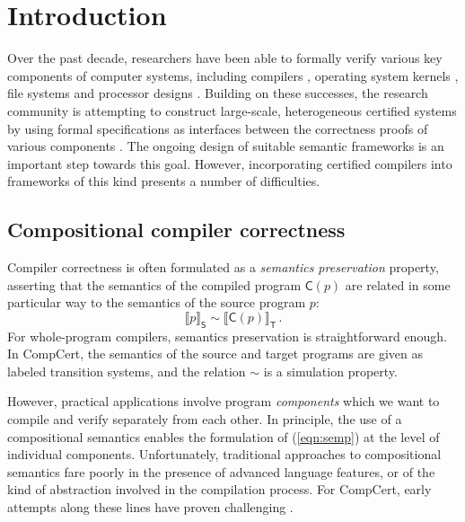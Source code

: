 \documentclass[sigplan,screen]{acmart}
\newcommand{\kw}[1]{\ensuremath{ \mathsf{#1} }}
\begin{document}


\maketitle

\section{Introduction} %


Over the past decade,
researchers have been able to formally verify
various key components of computer systems,
including
compilers \cite{compcert,cakeml,vellvm},
operating system kernels \cite{sel4,popl15},
file systems \cite{fscq} and
processor designs \cite{safe,kami}.
Building on these successes,
the research community is attempting
to construct large-scale, heterogeneous certified systems
by using formal specifications as interfaces between
the correctness proofs of various components
\cite{deepspec}.
The ongoing design of suitable semantic frameworks
is an important step towards this goal.
However,
incorporating certified compilers
into frameworks of this kind
presents a number of difficulties.


\subsection{Compositional compiler correctness} %

Compiler correctness is often formulated as a
\emph{semantics preservation} property,
asserting that the semantics
of the compiled program $\kw{C}(p)$
are related in some particular way
to the semantics
of the source program $p$:
\begin{equation} \label{eqn:semp}
  \llbracket p \rrbracket_\kw{S} \sim
  \llbracket \kw{C}(p) \rrbracket_\kw{T}
  \,.
\end{equation}
For whole-program compilers,
semantics preservation is straightforward enough.
In CompCert,
the semantics of the source and target programs
are given as labeled transition systems,
and the relation $\sim$ is a simulation property.

However,
practical applications involve
program \emph{components} which we want to compile
and verify separately from each other.
In principle,
the use of a compositional semantics
enables the formulation of (\ref{eqn:semp})
at the level of individual components.
Unfortunately, traditional approaches to compositional semantics
fare poorly in the presence of advanced language features,
or of the kind of abstraction
involved in the compilation process.
For CompCert,
early attempts along these lines
have proven
challenging \cite{cpp15,compcompcert}.
\end{document}
